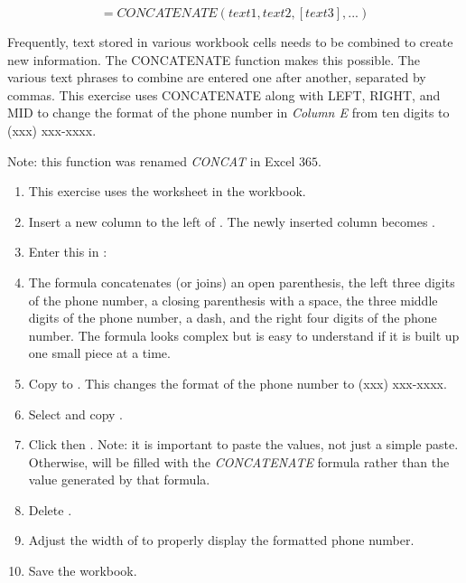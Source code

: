\[ =CONCATENATE(text1, text2, [text3], ...) \]

Frequently, text stored in various workbook cells needs to be combined to create new information. The CONCATENATE function makes this possible. The various text phrases to combine are entered one after another, separated by commas. This exercise uses CONCATENATE along with LEFT, RIGHT, and MID to change the format of the phone number in \textit{Column E} from ten digits to (xxx) xxx-xxxx.

 Note: this function was renamed \textit{CONCAT} in Excel $ 365 $.

\begin{enumbox}
	\begin{enumerate}
		\item This exercise uses the  worksheet in the  workbook.
		\item Insert a new column to the left of . The newly inserted column becomes .
		\item Enter this in : 
		\item The formula concatenates (or joins) an open parenthesis, the left three digits of the phone number, a closing parenthesis with a space, the three middle digits of the phone number, a dash, and the right four digits of the phone number. The formula looks complex but is easy to understand if it is built up one small piece at a time.
		\item Copy  to . This changes the format of the phone number to (xxx) xxx-xxxx.
		\item Select and copy .
		\item Click  then . Note: it is important to paste the values, not just a simple paste. Otherwise,  will be filled with the \textit{CONCATENATE} formula rather than the value generated by that formula.
		\item Delete .
		\item Adjust the width of  to properly display the formatted phone number.
		\item Save the  workbook.
	\end{enumerate}
\end{enumbox}
	
